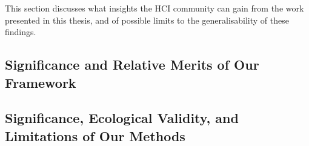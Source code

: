 This section discusses what insights the HCI community can gain from the work presented in this thesis, and of possible limits to the generalisability of these findings.

\subsection{Significance and Relative Merits of Our Framework}







\subsection{Significance, Ecological Validity, and Limitations of Our Methods}


